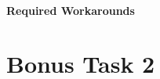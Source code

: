 			\paragraph{Required Workarounds} %
			\label{par:required_workarounds}





	\section{Bonus Task 2} %
	\label{sec:impl_bonus_task_2}
